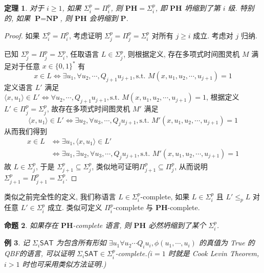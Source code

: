 \documentclass[8pt]{article}
\theoremstyle{compact}
\newtheorem{theorem}{定理}[section]
\newtheorem{proposition}[theorem]{命题}
\newtheorem{example}[theorem]{例}
\def\le{\leqslant}
\def\ge{\geqslant}
\def\P{\textbf{P}}
\def\NP{\textbf{NP}}
\def\PH{\textbf{PH}}
\begin{document}
\begin{theorem}
	对于 $i \ge 1$, 如果 $\Sigma_i^p = \Pi_i^p$, 则 $\PH = \Sigma_i^p$, 即 $\PH$ 坍缩到了第 $i$ 级. 特别的, 如果 $\P = \NP$, 则 $\PH$ 会坍缩到 $\P$. 
\end{theorem}
\begin{proof}
	如果 $\Sigma_i^p = \Pi_i^p$, 考虑证明 $\Sigma_j^p = \Pi_j^p = \Sigma_i^p$ 对所有 $j \ge i$ 成立. 考虑对 $j$ 归纳.

	已知 $\Sigma_j^p = \Pi_j^p = \Sigma_i^p$, 任取语言 $L \in \Sigma_j^p$, 则根据定义, 存在多项式时间图灵机 $M$ 满足对于任意 $x \in \{0, 1\}^*$ 有 $$x \in L \Leftrightarrow \exists u_1, \forall u_2, \cdots, Q_{j+1} u_{j+1}, \text{s.t. } M(x, u_1, u_2, \cdots, u_{j+1}) = 1$$
	定义语言 $L'$ 满足 $\langle x, u_1 \rangle \in L' \Leftrightarrow \forall u_2, \cdots, Q_{j+1} u_{j+1}, \text{s.t. } M(x, u_1, u_2, \cdots, u_{j+1}) = 1$, 根据定义 $L' \in \Pi_j^p = \Sigma_j^p$, 故存在多项式时间图灵机 $M'$ 满足$$\langle x, u_1 \rangle \in L' \Leftrightarrow \exists u_2, \forall u_3, \cdots, Q_j u_{j+1}, \text{s.t. } M'(x, u_1, u_2, \cdots, u_{j+1}) = 1$$
	从而我们得到 \begin{equation*}
		\begin{split}
			x \in L &\Leftrightarrow \exists u_1, \langle x, u_1 \rangle \in L' \\
			&\Leftrightarrow \exists u_1, \exists u_2, \forall u_3, \cdots, Q_j u_{j+1}, \text{s.t. } M'(x, u_1, u_2, \cdots, u_{j+1}) = 1
		\end{split}
	\end{equation*}
	故 $L \in \Sigma_j^p$, 于是 $\Sigma_{j+1}^p \subseteq \Sigma_j^p$, 类似地可证明$\Pi_{j+1}^p \subseteq \Pi_j^p$, 从而说明 $\Sigma_{j+1}^p = \Pi_{j+1}^p = \Sigma_i^p$.
\end{proof}


类似之前完全性的定义, 我们称语言 $L \in \Sigma_i^p$-complete, 如果 $L \in \Sigma_i^p$ 且 $L' \le_p L$ 对任意 $L' \in \Sigma_i^p$ 成立. 类似可定义 $\Pi_i^p$-complete 与 $\PH$-complete.

\begin{proposition}
	如果存在 $\PH$-complete 语言, 则 $\PH$ 必然坍缩到了某个 $\Sigma_i^p$.
\end{proposition}

\begin{example}
	记 $\Sigma_i\textsf{SAT}$ 为包含所有形如 $\exists u_1 \forall u_2 \cdots Q_iu_i, \phi(u_1, \cdots, u_i)$ 的真值为 True 的 QBF的语言, 可以证明 $\Sigma_i\textsf{SAT} \in \Sigma_i^p$-complete.($i = 1$ 时就是 Cook Levin Theorem, $i > 1$ 时也可采用类似方法证明.)
\end{example}
\end{document}
